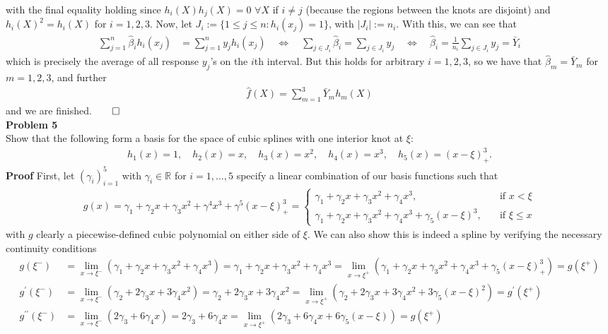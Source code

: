 \documentclass[10pt]{article}
\newcommand{\mbb}[1]{\mathbb{#1}}
\newcommand{\1}[1]{\mathbbm{1}_{#1}}
\begin{document}
    with the final equality holding since $h_i(X)h_j(X)=0$ $\forall X$ if $i\neq j$ (because the regions between the knots are disjoint) and $h_i(X)^2=h_i(X)$ for $i=1,2,3$. Now, let $J_i:=\{1\leq j\leq n: h_i(x_j)=1\}$, with $|J_i|:=n_i$. With this, we can see that
    \begin{align*}
        \sum_{j=1}^n\hat{\beta}_ih_i(x_j)&=\sum_{j=1}^ny_jh_i(x_j)\quad\Leftrightarrow\quad \sum_{j\in J_i}\hat{\beta}_i=\sum_{j\in J_i}y_j\quad\Leftrightarrow\quad \hat{\beta}_i=\frac{1}{n_i}\sum_{j\in J_i}y_j=\bar{Y}_i
    \end{align*}
    which is precisely the average of all response $y_j$'s on the $i$th interval. But this holds for arbitrary $i=1,2,3$, so we have that $\hat{\beta}_m=\bar{Y}_m$ for $m=1,2,3$, and further
    \begin{align*}
        \hat{f}(X)=\sum_{m=1}^3\bar{Y}_mh_m(X)
    \end{align*} 
    and we are finished.\hfill{$\qed$}\\[5pt]
    {\bf Problem 5}\\[5pt]
    Show that the following form a basis for the space of cubic splines with one interior knot at $\xi$:
    \begin{align*}
        h_1(x)=1,\quad h_2(x)=x,\quad h_3(x)=x^2,\quad h_4(x)=x^3,\quad h_5(x)=(x-\xi)^3_+.
    \end{align*}
    {\bf Proof}\hspace{5pt} First, let $(\gamma_i)_{i=1}^5$ with $\gamma_i\in\mbb{R}$ for $i=1,\dots,5$ specify a linear combination of our basis functions such that
    \begin{align*}
        g(x)=\gamma_1+\gamma_2x+\gamma_3x^2+\gamma^4x^3+\gamma^5(x-\xi)_+^3=\begin{cases}
            \gamma_1+\gamma_2x+\gamma_3x^2+\gamma_4x^3,\quad&\text{if $x<\xi$}\\
            \gamma_1+\gamma_2x+\gamma_3x^2+\gamma_4x^3+\gamma_5(x-\xi)^3,\quad&\text{if $\xi\leq x$}
        \end{cases}
    \end{align*}
    with $g$ clearly a piecewise-defined cubic polynomial on either side of $\xi$. We can also show this is indeed a spline by verifying the necessary continuity conditions
    \begin{align*}
        g(\xi^-)&=\lim_{x\rightarrow\xi^-}(\gamma_1+\gamma_2x+\gamma_3x^2+\gamma_4x^3)=\gamma_1+\gamma_2x+\gamma_3x^2+\gamma_4x^3=\lim_{x\rightarrow\xi^+}(\gamma_1+\gamma_2x+\gamma_3x^2+\gamma_4x^3+\gamma_5(x-\xi)^3_+)=g(\xi^+)\\
        g^{\prime}(\xi^-)&=\lim_{x\rightarrow\xi^-}(\gamma_2+2\gamma_3x+3\gamma_4x^2)=\gamma_2+2\gamma_3x+3\gamma_4x^2=\lim_{x\rightarrow\xi^+}(\gamma_2+2\gamma_3x+3\gamma_4x^2+3\gamma_5(x-\xi)^2)=g^\prime(\xi^+)\\
        g^{\prime\prime}(\xi^-)&=\lim_{x\rightarrow\xi^-}(2\gamma_3+6\gamma_4x)=2\gamma_3+6\gamma_4x=\lim_{x\rightarrow\xi^+}(2\gamma_3+6\gamma_4x+6\gamma_5(x-\xi))=g(\xi^+)
    \end{align*} 
\end{document}
